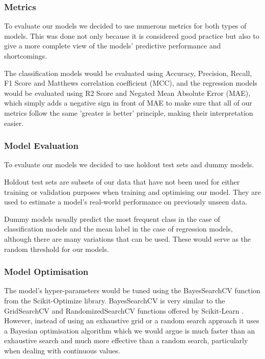 \subsubsection{Metrics}

To evaluate our models we decided to use numerous metrics for both types of models. This was done not only because it is considered good practice but also to give a more complete view of the models' predictive performance and shortcomings.

The classification models would be evaluated using Accuracy, Precision, Recall, F1 Score and Matthews correlation coefficient (MCC), and the regression models would be evaluated using R2 Score and Negated Mean Absolute Error (MAE), which simply adds a negative sign in front of MAE to make sure that all of our metrics follow the same 'greater is better' principle, making their interpretation easier.

\subsubsection{Model Evaluation}
\label{subsubsec:Model_Evaluation}

To evaluate our models we decided to use holdout test sets and dummy models.

Holdout test sets are subsets of our data that have not been used for either training or validation purposes when training and optimising our model. They are used to estimate a model's real-world performance on previously unseen data.

Dummy models usually predict the most frequent class in the case of classification models and the mean label in the case of regression models, although there are many variations that can be used. These would serve as the random threshold for our models.

\subsubsection{Model Optimisation}
\label{subsubsec:Model_Optimisation}

The model's hyper-parameters would be tuned using the BayesSearchCV function from the Scikit-Optimize \citep{scikit-optimize} library. BayesSearchCV is very similar to the GridSearchCV and RandomizedSearchCV functions offered by Scikit-Learn \citep{scikit-learn}. However, instead of using an exhaustive grid or a random search approach it uses a Bayesian optimisation algorithm which we would argue is much faster than an exhaustive search and much more effective than a random search, particularly when dealing with continuous values. 

